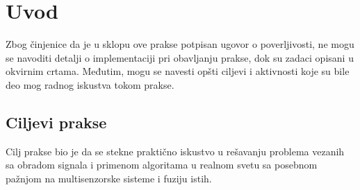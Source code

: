 \chapter{Uvod}

Zbog činjenice da je u sklopu ove prakse potpisan ugovor o poverljivosti, 
ne mogu se navoditi detalji o implementaciji pri obavljanju prakse, dok su zadaci
opisani u okvirnim crtama. Međutim, mogu se navesti opšti ciljevi i aktivnosti koje su 
bile deo mog radnog iskustva tokom prakse.

\section{Ciljevi prakse}

Cilj prakse bio je da se stekne praktično iskustvo u rešavanju problema vezanih sa obradom
signala i primenom algoritama u realnom svetu sa posebnom pažnjom na multisenzorske sisteme i fuziju istih.

